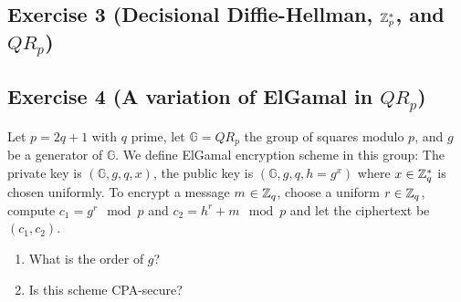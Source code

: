 \subsection{Exercise 3 (Decisional Diffie-Hellman, \texorpdfstring{$\mathbb{Z}^*_p$}{Zp}, and \texorpdfstring{$QR_p$}{QRp})}




\subsection{Exercise 4 (A variation of ElGamal in \texorpdfstring{$QR_p$}{QRp})}

Let $p=2q+1$ with $q$ prime, let $\mathbb{G}=QR_p$ the group of squares modulo $p$, and $g$ be a generator of $\mathbb{G}$.
We define ElGamal encryption scheme in this group: The private key is $(\mathbb{G},g,q,x)$, the public key is $(\mathbb{G},g,q,h=g^x)$
where $x \in \mathbb{Z}_{q}^*$ is chosen uniformly. To encrypt a message $m$ $\in \mathbb{Z}_{q}$, choose a uniform $r \in \mathbb{Z}_{q}$, compute $c_1=g^r \mod p$ and $c_2=h^r+m \mod p$ and let the ciphertext be $(c_1,c_2)$.

\begin{enumerate}
	\item What is the order of $g$?
	\item Is this scheme CPA-secure?
\end{enumerate}


